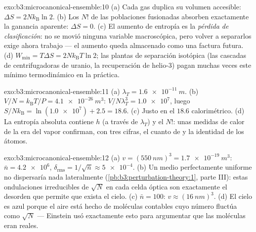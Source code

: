 \begin{solution}{exo:b3:microcanonical-ensemble:10}
(a) Cada gas duplica su volumen accesible: $\Delta S =
2Nk_{\text{B}}\ln2$. (b) Los $N!$ de las poblaciones fusionadas
absorben exactamente la ganancia aparente: $\Delta S = 0$. (c) El aumento
de entropía es la \emph{pérdida de clasificación}: no se movió ninguna
variable macroscópica, pero volver a separarlos exige ahora trabajo --- el
aumento queda almacenado como una factura futura. (d) $W_{\min} = T\Delta S =
2Nk_{\text{B}}T\ln2$; las plantas de separación isotópica (las cascadas de
centrifugadoras de uranio, la recuperación de helio-3) pagan muchas veces
este mínimo termodinámico en la práctica.
\end{solution}

\begin{solution}{exo:b3:microcanonical-ensemble:11}
(a) $\lambda_T = \qty{1.6e-11}{m}$. (b) $V/N = k_{\text{B}}T/P =
\qty{4.1e-26}{m^3}$: $V/N\lambda_T^3 = \num{1.0e7}$, luego
$S/Nk_{\text{B}} = \ln(\num{1.0e7}) + 2.5 = 18.6$. (c) Justo en el
$18.6$ calorimétrico. (d) La entropía absoluta contiene $h$
(a través de $\lambda_T$) y el $N!$: unas medidas de calor de
la era del vapor confirman, con tres cifras, el cuanto de  y
la identidad de los átomos.
\end{solution}

\begin{solution}{exo:b3:microcanonical-ensemble:12}
(a) $v = (\qty{550}{nm})^3 = \qty{1.7e-19}{m^3}$: $\bar n =
\num{4.2e6}$, $\delta_{\text{rms}} = 1/\sqrt{\bar n} \approx
\num{5e-4}$. (b) Un medio perfectamente uniforme no dispersaría nada
lateralmente (\cref{pb:b3:perturbation-theory:1}, parte III): estas
ondulaciones irreducibles de $\sqrt N$ en cada celda óptica son exactamente
el desorden que permite que exista el cielo. (c) $\bar n = 100$: $v
\approx (\qty{16}{nm})^3$. (d) El cielo es azul porque el aire está hecho
de moléculas contables cuyo número fluctúa como $\sqrt N$ ---
Einstein usó exactamente esto para argumentar que las moléculas eran reales.
\end{solution}

